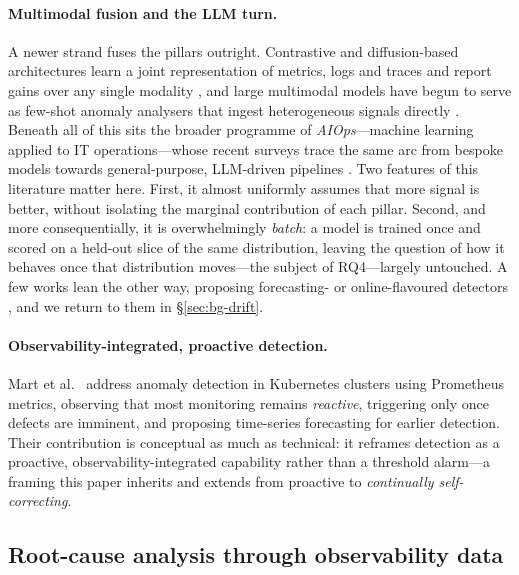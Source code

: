 \documentclass[acmsmall]{acmart}
\begin{document}
\paragraph{Multimodal fusion and the LLM turn.} A newer strand fuses the pillars outright. Contrastive and diffusion-based architectures learn a joint representation of metrics, logs and traces and report gains over any single modality \cite{wang2025multimodal,zhang2026modify}, and large multimodal models have begun to serve as few-shot anomaly analysers that ingest heterogeneous signals directly \cite{zhuang2024multimodal}. Beneath all of this sits the broader programme of \emph{AIOps}---machine learning applied to IT operations---whose recent surveys trace the same arc from bespoke models towards general-purpose, LLM-driven pipelines \cite{zhang2024aiops}. Two features of this literature matter here. First, it almost uniformly assumes that more signal is better, without isolating the marginal contribution of each pillar. Second, and more consequentially, it is overwhelmingly \emph{batch}: a model is trained once and scored on a held-out slice of the same distribution, leaving the question of how it behaves once that distribution moves---the subject of RQ4---largely untouched. A few works lean the other way, proposing forecasting- or online-flavoured detectors \cite{xu2024forecasting,wette2024omlad}, and we return to them in \S\ref{sec:bg-drift}.

\paragraph{Observability-integrated, proactive detection.} Mart et al.\ \cite{mart2020} address anomaly detection in Kubernetes clusters using Prometheus metrics, observing that most monitoring remains \emph{reactive}, triggering only once defects are imminent, and proposing time-series forecasting for earlier detection. Their contribution is conceptual as much as technical: it reframes detection as a proactive, observability-integrated capability rather than a threshold alarm---a framing this paper inherits and extends from proactive to \emph{continually self-correcting}.

\subsection{Root-cause analysis through observability data}\label{sec:bg-rca}
\end{document}
